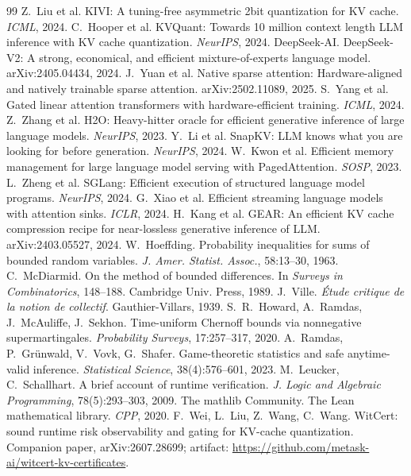 \documentclass[11pt]{article}
\begin{document}
\begingroup\small
\begin{thebibliography}{99}
 Z.~Liu et al. KIVI: A tuning-free asymmetric 2bit quantization for
KV cache. \emph{ICML}, 2024.
 C.~Hooper et al. KVQuant: Towards 10 million context length LLM
inference with KV cache quantization. \emph{NeurIPS}, 2024.
 DeepSeek-AI. DeepSeek-V2: A strong, economical, and efficient
mixture-of-experts language model. arXiv:2405.04434, 2024.
 J.~Yuan et al. Native sparse attention: Hardware-aligned and natively
trainable sparse attention. arXiv:2502.11089, 2025.
 S.~Yang et al. Gated linear attention transformers with
hardware-efficient training. \emph{ICML}, 2024.
 Z.~Zhang et al. H2O: Heavy-hitter oracle for efficient generative
inference of large language models. \emph{NeurIPS}, 2023.
 Y.~Li et al. SnapKV: LLM knows what you are looking for before
generation. \emph{NeurIPS}, 2024.
 W.~Kwon et al. Efficient memory management for large language model
serving with PagedAttention. \emph{SOSP}, 2023.
 L.~Zheng et al. SGLang: Efficient execution of structured language
model programs. \emph{NeurIPS}, 2024.
 G.~Xiao et al. Efficient streaming language models with
attention sinks. \emph{ICLR}, 2024.
 H.~Kang et al. GEAR: An efficient KV cache compression recipe for
near-lossless generative inference of LLM. arXiv:2403.05527, 2024.
 W.~Hoeffding. Probability inequalities for sums of bounded
random variables. \emph{J. Amer. Statist. Assoc.}, 58:13--30, 1963.
 C.~McDiarmid. On the method of bounded differences. In
\emph{Surveys in Combinatorics}, 148--188. Cambridge Univ. Press, 1989.
 J.~Ville. \emph{\'Etude critique de la notion de collectif}.
Gauthier-Villars, 1939.
 S.~R.~Howard, A.~Ramdas, J.~McAuliffe, J.~Sekhon.
Time-uniform Chernoff bounds via nonnegative supermartingales.
\emph{Probability Surveys}, 17:257--317, 2020.
 A.~Ramdas, P.~Gr\"unwald, V.~Vovk, G.~Shafer.
Game-theoretic statistics and safe anytime-valid inference.
\emph{Statistical Science}, 38(4):576--601, 2023.
 M.~Leucker, C.~Schallhart. A brief account of runtime
verification. \emph{J. Logic and Algebraic Programming}, 78(5):293--303, 2009.
 The mathlib Community. The Lean mathematical library.
\emph{CPP}, 2020.
 F.~Wei, L.~Liu, Z.~Wang, C.~Wang. WitCert: sound
runtime risk observability and gating for KV-cache quantization. Companion
paper, arXiv:2607.28699; artifact:
\url{https://github.com/metask-ai/witcert-kv-certificates}.
\end{thebibliography}
\endgroup
\end{document}
